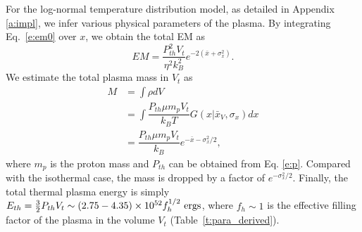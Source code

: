 \documentclass[usenatbib]{mnras}
\begin{document}
For the log-normal temperature distribution model, as detailed in Appendix \ref{a:impl}, we infer various physical parameters of the plasma. By integrating Eq.~\ref{e:em0} over $x$, we obtain the total EM as
\begin{equation}
EM  =\dfrac{P_{th}^2 V_t}{\eta^2 k_B^2} e^{-2(\bar{x} + \sigma_x^2)}.
\label{e:em}
\end{equation}
We estimate the total plasma mass in $V_{t}$ as
\begin{equation}
\begin{split}
M & = \int \rho dV\\ 
& = \int \dfrac{P_{th}\mu m_{p} V_{t}}{k_B T} G(x|\bar{x}_V,\sigma_x) dx \\
& = \dfrac{P_{th}\mu m_{p} V_{t}}{k_B} e^{-\bar{x}-\sigma_x^2/2},
\label{e:mass}
\end{split}
\end{equation}
where $m_{p}$ is the proton mass and $P_{th}$ can be obtained from Eq. \ref{e:p}. Compared with the isothermal case, the mass is dropped by a factor of $e^{-\sigma_x^2/2}$.  Finally, the total thermal plasma energy is simply $E_{th} =\frac{3}{2} P_{th} V _{t} \sim (2.75-4.35) \times 10^{52} f_h^{1/2}
{\rm~ergs}$, where $f_{h} \sim 1$ is the effective filling factor of the plasma in the volume $V_{t}$ (Table~\ref{t:para_derived}).
\end{document}
